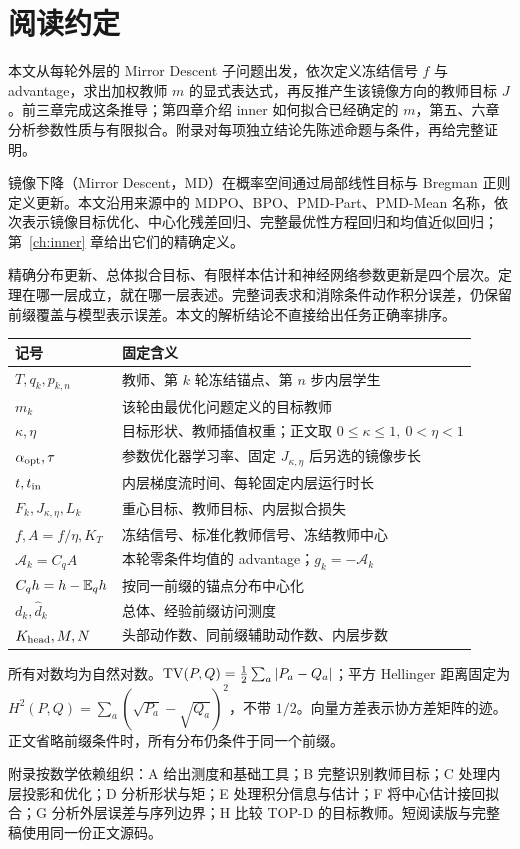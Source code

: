 \chapter*{阅读约定}
本文从每轮外层的 Mirror Descent 子问题出发，依次定义冻结信号 $f$ 与 advantage，求出加权教师 $m$ 的显式表达式，再反推产生该镜像方向的教师目标 $J$。前三章完成这条推导；第四章介绍 inner 如何拟合已经确定的 $m$，第五、六章分析参数性质与有限拟合。附录对每项独立结论先陈述命题与条件，再给完整证明。

镜像下降（Mirror Descent，MD）在概率空间通过局部线性目标与 Bregman 正则定义更新。本文沿用来源中的 MDPO、BPO、PMD-Part、PMD-Mean 名称，依次表示镜像目标优化、中心化残差回归、完整最优性方程回归和均值近似回归；第~\ref{ch:inner} 章给出它们的精确定义。

精确分布更新、总体拟合目标、有限样本估计和神经网络参数更新是四个层次。定理在哪一层成立，就在哪一层表述。完整词表求和消除条件动作积分误差，仍保留前缀覆盖与模型表示误差。本文的解析结论不直接给出任务正确率排序。

\begin{center}
\begin{tabular}{lp{100mm}}
\toprule
记号 & 固定含义\\
\midrule
$T,q_k,p_{k,n}$ & 教师、第 $k$ 轮冻结锚点、第 $n$ 步内层学生\\
$m_k$ & 该轮由最优化问题定义的目标教师\\
$\kappa,\eta$ & 目标形状、教师插值权重；正文取 $0\le\kappa\le1,\ 0<\eta<1$\\
$\alpha_{\rm opt},\tau$ & 参数优化器学习率、固定 $J_{\kappa,\eta}$ 后另选的镜像步长\\
$t,t_{\rm in}$ & 内层梯度流时间、每轮固定内层运行时长\\
$F_k,J_{\kappa,\eta},L_k$ & 重心目标、教师目标、内层拟合损失\\
$f,A=f/\eta,K_T$ & 冻结信号、标准化教师信号、冻结教师中心\\
$\mathcal A_k=C_qA$ & 本轮零条件均值的 advantage；$g_k=-\mathcal A_k$\\
$C_qh=h-\mathbb E_qh$ & 按同一前缀的锚点分布中心化\\
$d_k,\widehat d_k$ & 总体、经验前缀访问测度\\
$K_{\rm head},M,N$ & 头部动作数、同前缀辅助动作数、内层步数\\
\bottomrule
\end{tabular}
\end{center}

所有对数均为自然对数。$\operatorname{TV}(P,Q)=\frac12\sum_a|P_a-Q_a|$；平方 Hellinger 距离固定为 $H^2(P,Q)=\sum_a(\sqrt{P_a}-\sqrt{Q_a})^2$，不带 $1/2$。向量方差表示协方差矩阵的迹。正文省略前缀条件时，所有分布仍条件于同一个前缀。

附录按数学依赖组织：A 给出测度和基础工具；B 完整识别教师目标；C 处理内层投影和优化；D 分析形状与矩；E 处理积分信息与估计；F 将中心估计接回拟合；G 分析外层误差与序列边界；H 比较 TOP-D 的目标教师。短阅读版与完整稿使用同一份正文源码。
